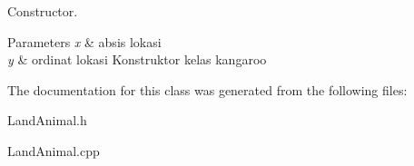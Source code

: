 Constructor. 


\begin{DoxyParams}{Parameters}
{\em x} & absis lokasi \\
\hline
{\em y} & ordinat lokasi Konstruktor kelas kangaroo \\
\hline
\end{DoxyParams}


The documentation for this class was generated from the following files\+:\begin{DoxyCompactItemize}
\item 
Land\+Animal.\+h\item 
Land\+Animal.\+cpp\end{DoxyCompactItemize}
